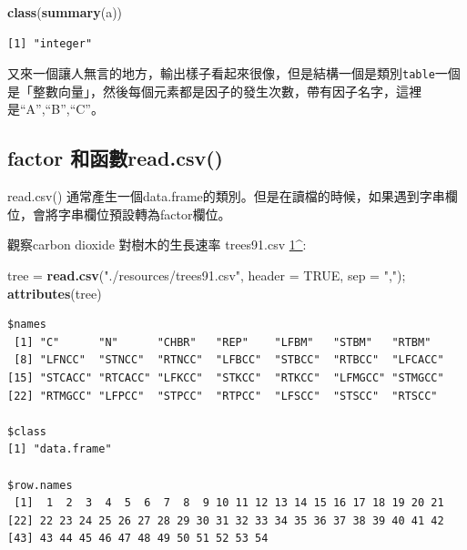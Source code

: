 \documentclass[]{book}
\newenvironment{Shaded}{\begin{snugshade}}{\end{snugshade}}
\newcommand{\DataTypeTok}[1]{\textcolor[rgb]{0.13,0.29,0.53}{#1}}
\newcommand{\KeywordTok}[1]{\textcolor[rgb]{0.13,0.29,0.53}{\textbf{#1}}}
\newcommand{\NormalTok}[1]{#1}
\newcommand{\OtherTok}[1]{\textcolor[rgb]{0.56,0.35,0.01}{#1}}
\newcommand{\StringTok}[1]{\textcolor[rgb]{0.31,0.60,0.02}{#1}}
\theoremstyle{definition}
\theoremstyle{definition}
\theoremstyle{definition}
\theoremstyle{remark}
\begin{document}
\begin{Shaded}
\begin{Highlighting}[]
\KeywordTok{class}\NormalTok{(}\KeywordTok{summary}\NormalTok{(a))}
\end{Highlighting}
\end{Shaded}

\begin{verbatim}
[1] "integer"
\end{verbatim}

又來一個讓人無言的地方，輸出樣子看起來很像，但是結構一個是類別\texttt{table}一個是「整數向量」，然後每個元素都是因子的發生次數，帶有因子名字，這裡是``A'',``B'',``C''。

\hypertarget{factor-read.csv}{%
\subsection{factor 和函數read.csv()}\label{factor-read.csv}}

read.csv()
通常產生一個data.frame的類別。但是在讀檔的時候，如果遇到字串欄位，會將字串欄位預設轉為factor欄位。

觀察carbon dioxide 對樹木的生長速率 trees91.csv
\href{The\%20original\%20spreadsheet\%20is\%20located\%20at\%20http://cdiac.ornl.gov/ftp/ndp061a/trees91.wk1.}{1\^{}}:

\begin{Shaded}
\begin{Highlighting}[]
\NormalTok{tree =}\StringTok{ }\KeywordTok{read.csv}\NormalTok{(}\StringTok{"./resources/trees91.csv"}\NormalTok{, }\DataTypeTok{header =} \OtherTok{TRUE}\NormalTok{, }\DataTypeTok{sep =} \StringTok{","}\NormalTok{);}
\KeywordTok{attributes}\NormalTok{(tree)}
\end{Highlighting}
\end{Shaded}

\begin{verbatim}
$names
 [1] "C"      "N"      "CHBR"   "REP"    "LFBM"   "STBM"   "RTBM"  
 [8] "LFNCC"  "STNCC"  "RTNCC"  "LFBCC"  "STBCC"  "RTBCC"  "LFCACC"
[15] "STCACC" "RTCACC" "LFKCC"  "STKCC"  "RTKCC"  "LFMGCC" "STMGCC"
[22] "RTMGCC" "LFPCC"  "STPCC"  "RTPCC"  "LFSCC"  "STSCC"  "RTSCC" 

$class
[1] "data.frame"

$row.names
 [1]  1  2  3  4  5  6  7  8  9 10 11 12 13 14 15 16 17 18 19 20 21
[22] 22 23 24 25 26 27 28 29 30 31 32 33 34 35 36 37 38 39 40 41 42
[43] 43 44 45 46 47 48 49 50 51 52 53 54
\end{verbatim}
\end{document}
